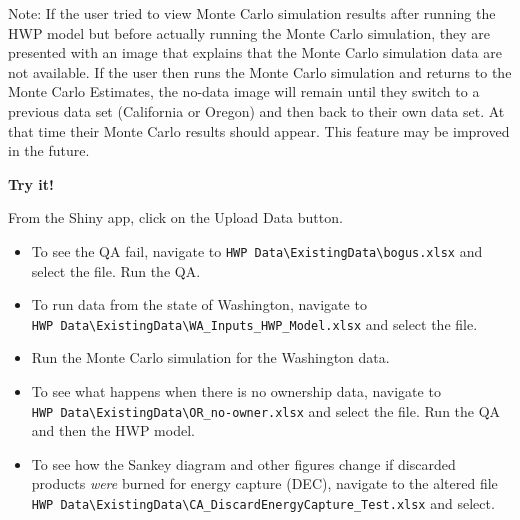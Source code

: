 \documentclass[
  openany]{book}
\providecommand{\tightlist}{%
  \setlength{\itemsep}{0pt}\setlength{\parskip}{0pt}}
\begin{document}
Note: If the user tried to view Monte Carlo simulation results after running the HWP model but before actually running the Monte Carlo simulation, they are presented with an image that explains that the Monte Carlo simulation data are not available. If the user then runs the Monte Carlo simulation and returns to the Monte Carlo Estimates, the no-data image will remain until they switch to a previous data set (California or Oregon) and then back to their own data set. At that time their Monte Carlo results should appear. This feature may be improved in the future.

\begin{greybox}

\begin{minipage}{.85\linewidth}

\begin{center}
\textbf{Try it!}

\end{center}

From the Shiny app, click on the Upload Data button.

\begin{itemize}
\tightlist
\item
  To see the QA fail, navigate to \texttt{HWP\ Data\textbackslash{}ExistingData\textbackslash{}bogus.xlsx} and select the file. Run the QA.\\
\item
  To run data from the state of Washington, navigate to \texttt{HWP\ Data\textbackslash{}ExistingData\textbackslash{}WA\_Inputs\_HWP\_Model.xlsx} and select the file.\\
\item
  Run the Monte Carlo simulation for the Washington data.
\item
  To see what happens when there is no ownership data, navigate to \texttt{HWP\ Data\textbackslash{}ExistingData\textbackslash{}OR\_no-owner.xlsx} and select the file. Run the QA and then the HWP model.\\
\item
  To see how the Sankey diagram and other figures change if discarded products \emph{were} burned for energy capture (DEC), navigate to the altered file
  \texttt{HWP\ Data\textbackslash{}ExistingData\textbackslash{}CA\_DiscardEnergyCapture\_Test.xlsx} and select.
\end{itemize}

\end{minipage}

\end{greybox}
\end{document}
